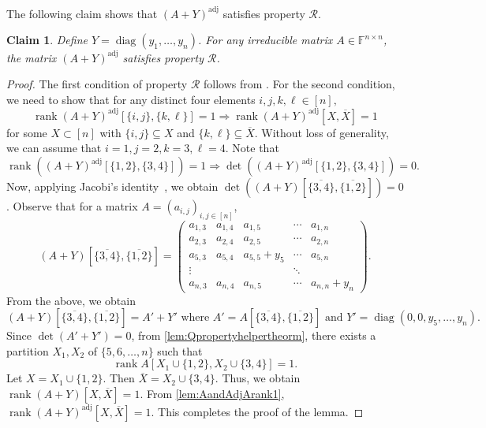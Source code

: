 \documentclass[11pt,letterpaper]{article}
\DeclareMathOperator*{\diag}{diag}
\DeclareMathOperator*{\rank}{rank}
\newcommand{\comp}[1]{\overline{#1}}
\newcommand{\F}{\mathbb{F}}
\newtheorem{claim}{Claim}[section]
\newtheorem{remark}{Remark}[section]
\DeclareMathOperator{\ad}{adj}
\newcommand{\adj}[1]{(#1)^{\ad}}
\newcommand{\PME}{\stackrel{\mathclap{\scalebox{.4}{\mbox{PME}}}}{=}}
\newcommand{\kPME}[3]{\mathrm{PME}(#1, #2, #3)}
\newcommand{\prop}{\mathcal{R}}
\begin{document}
{{{The following claim shows that $\adj{A+Y}$ satisfies property $\prop$.
\begin{claim} \label{clm:AplusYsatisfy}
Define $Y = \diag(y_1, \ldots, y_n)$. For any irreducible matrix $A\in \mathbb{F}^{n\times n}$, the matrix $\adj{A+Y}$ satisfies property $\prop$.
\end{claim}
\begin{proof}
The first condition of property $\prop$ follows from \cite[Theorem 1]{Hartfiell84}. For the second condition, we need to show that for any distinct four elements $i,j,k,\ell\in [n],$ $$\rank \adj{A+Y}[\{i,j\},\{k,\ell\}]=1\Longrightarrow \rank \adj{A+Y}[X,\comp{X}]=1$$ for some $X\subset [n]$ with $\{i,j\}\subseteq X$ and $\{k,\ell\}\subseteq \comp{X}$. Without loss of generality, we can assume that $i=1,j=2,k=3,\ell=4$. Note that $$\rank(\adj{A+Y}[\{1,2\},\{3,4\}])=1\Longrightarrow \det(\adj{A+Y}[\{1,2\},\{3,4\}])=0.$$ Now, applying Jacobi's identity~\cite[Page~21]{Gantmacher59}, we obtain $\det((A+Y)[\comp{\{3,4\}},\comp{\{1,2\} }])=0$. Observe that for a matrix $A=(a_{i,j})_{i,j\in[n]}$,
\[
(A+Y)[\comp{\{3,4\}},\comp{\{1,2\} }]= \begin{pmatrix} a_{1,3} & a_{1,4} & a_{1,5} & \cdots & a_{1,n}\\
    a_{2,3} & a_{2,4} & a_{2,5} & \cdots & a_{2,n}\\
    a_{5,3} & a_{5,4} & a_{5,5}+y_5 & \cdots & a_{5,n}\\
    \vdots & & & \ddots &\\
    a_{n,3} & a_{n,4} & a_{n,5} & \cdots & a_{n,n}+y_n \end{pmatrix}.\]
From the above, we obtain $$(A+Y)[\comp{\{3,4\}},\comp{\{1,2\} }]=A'+Y' \text{ where } A'= A[\comp{\{3,4\}},\comp{\{1,2\} }] \text{ and } Y'= \diag(0,0, y_5,\dots,y_n).$$ Since $\det(A'+Y')=0$, from \cref{lem:Qpropertyhelpertheorm}, there exists a partition $X_1,X_2$ of $\{5, 6,\ldots,n\}$ such that $$\rank A[X_1\cup\{1, 2\},X_2\cup\{3, 4\}]= 1.$$ Let $X=X_1\cup \{1,2\}$. Then $\comp{X}=X_2\cup \{3, 4\}$. Thus, we obtain $\rank (A+Y)[X,\comp{X}]=1$. From \cref{lem:AandAdjArank1}, $\rank \adj{A+Y}[X,\comp{X}]=1$. This completes the proof of the lemma.
\end{proof}


}}}
\end{document}
